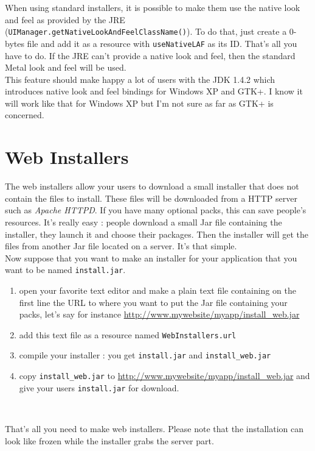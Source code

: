When using standard installers, it is possible to make them use the native
look and feel as provided by the JRE
(\texttt{UIManager.getNativeLookAndFeelClassName()}). To do that, just create
a 0-bytes file and add it as a resource with \texttt{useNativeLAF} as its ID.
That's all you have to do. If the JRE can't provide a native look and feel, then
the standard Metal look and feel will be used.\\

This feature should make happy a lot of users with the JDK 1.4.2 which
introduces native look and feel bindings for Windows XP and GTK+. I know it will
work like that for Windows XP but I'm not sure as far as GTK+ is concerned.\\

\section{Web Installers}

The web installers allow your users to download a small installer that does not
contain the files to install. These files will be downloaded from a HTTP server
such as \textit{Apache HTTPD}. If you have many optional packs, this can save
people's resources. It's really easy : people download a small Jar
file containing the installer, they launch it and choose their
packages. Then the installer will get the files from another Jar file
located on a server. It's that simple.\\

Now suppose that you want to make an installer for your application
that you want to be named \texttt{install.jar}.
\begin{enumerate}
  \item open your favorite text editor and make a plain text file
  containing on the first line the URL to where you want to put the
  Jar file containing your packs, let's say for instance
  \url{http://www.mywebsite/myapp/install_web.jar}
  \item add this text file as a resource named
  \texttt{WebInstallers.url}
  \item compile your installer : you get \texttt{install.jar} and
  \texttt{install\_web.jar}
  \item copy \texttt{install\_web.jar} to
  \url{http://www.mywebsite/myapp/install_web.jar} and give your
  users \texttt{install.jar} for download.
\end{enumerate}\

That's all you need to make web installers.
Please note that the installation can look like frozen while the installer
grabs the server part.\\

